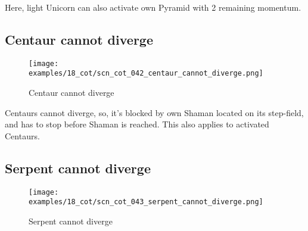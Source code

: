 Here, light Unicorn can also activate own Pyramid with 2 remaining momentum.

\clearpage %

\subsection*{Centaur cannot diverge}
\label{sec:Conquest of Tlalocan/Divergence/Centaur cannot diverge}

\vspace*{-1.4\baselineskip}
\noindent
\begin{figure}[!h]
\texttt{[image: examples/18\_cot/scn\_cot\_042\_centaur\_cannot\_diverge.png]}
\vspace*{-1.3\baselineskip}
\caption{Centaur cannot diverge}
\label{fig:scn_cot_042_centaur_cannot_diverge}
\end{figure}

\vspace*{-0.5\baselineskip}
Centaurs cannot diverge, so, it's blocked by own Shaman located on its step-field,
and has to stop before Shaman is reached. This also applies to activated Centaurs.

\clearpage %

\subsection*{Serpent cannot diverge}
\label{sec:Conquest of Tlalocan/Divergence/Serpent cannot diverge}

\vspace*{-1.4\baselineskip}
\noindent
\begin{figure}[!h]
\texttt{[image: examples/18\_cot/scn\_cot\_043\_serpent\_cannot\_diverge.png]}
\vspace*{-1.3\baselineskip}
\caption{Serpent cannot diverge}
\label{fig:scn_cot_043_serpent_cannot_diverge}
\end{figure}

